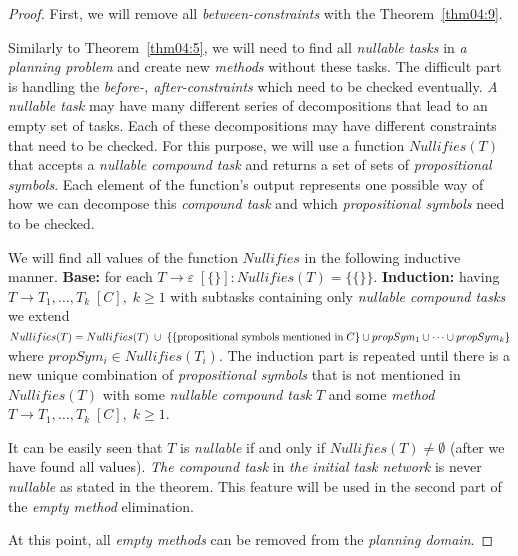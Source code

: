 \begin{proof}
    First, we will remove all \emph{between-constraints} with the Theorem~\ref{thm04:9}.

    Similarly to Theorem~\ref{thm04:5}, we will need to find all \emph{nullable tasks} in \emph{a planning problem} and create new \emph{methods} without these tasks. The difficult part is handling the \emph{before-, after-constraints} which need to be checked eventually. \emph{A nullable task} may have many different series of decompositions that lead to an empty set of tasks. Each of these decompositions may have different constraints that need to be checked. For this purpose, we will use a function $Nullifies(T)$ that accepts a \emph{nullable compound task} and returns a set of sets of \emph{propositional symbols}. Each element of the function's output represents one possible way of how we can decompose this \emph{compound task} and which \emph{propositional symbols} need to be checked.

    We will find all values of the function $Nullifies$ in the following inductive manner. \textbf{Base:} for each $T \rightarrow \varepsilon \; [\{\}]: Nullifies(T) = \{\{\}\}$. \textbf{Induction:} having $T \rightarrow T_1, \dots, T_k \; [C], \; k \geq 1$ with subtasks containing only \emph{nullable compound tasks} we extend $Nullifies(T) = Nullifies(T) \; \cup \; \{\{\text{propositional symbols mentioned in} \; C\} \\ \cup propSym_1 \cup \dots \cup propSym_k\}$ where $propSym_i \in Nullifies(T_i)$. The induction part is repeated until there is a new unique combination of \emph{propositional symbols} that is not mentioned in $Nullifies(T)$ with some \emph{nullable compound task} $T$ and some \emph{method} $T \rightarrow T_1, \dots, T_k \; [C], \; k \geq 1$.

    It can be easily seen that $T$ is \emph{nullable} if and only if $Nullifies(T) \neq \emptyset$ (after we have found all values). \emph{The compound task} in \emph{the initial task network} is never \emph{nullable} as stated in the theorem. This feature will be used in the second part of the \emph{empty method} elimination.

    At this point, all \emph{empty methods} can be removed from the \emph{planning domain}.


\end{proof}
